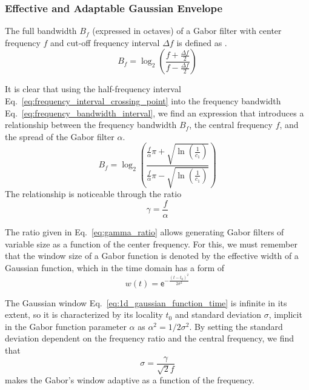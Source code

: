 \subsubsection{Effective and Adaptable Gaussian Envelope}
The full bandwidth $B_f$ (expressed in octaves) of a Gabor filter with center frequency $f$ and cut-off frequency interval $\Delta f$ is defined as \citep{Daugman:JOSA:1985}.
\begin{equation}\label{eq:frequency_bandwidth_interval}
    B_f = \log_2 \left( \frac{f + \frac{\Delta f}{2} }{f - \frac{\Delta f}{2}} \right)
\end{equation}

It is clear that using the half-frequency interval Eq.\ \eqref{eq:frequency_interval_crossing_point} into the frequency bandwidth Eq.\ \eqref{eq:frequency_bandwidth_interval}, we find an expression that introduces a relationship between the frequency bandwidth $B_f$, the central frequency $f$, and the spread of the Gabor filter $\alpha$.
\begin{equation}\label{eq:frequency_bandwidth}
    B_f = \log_2 \left( \frac{ \frac{f}{\alpha} \pi + \sqrt{\ln \left(\frac{1}{c_1}\right)} }{ \frac{f}{\alpha} \pi - \sqrt{\ln \left(\frac{1}{c_1}\right)} } \right)
\end{equation}
The relationship is noticeable through the ratio 
\begin{equation}\label{eq:gamma_ratio}
    \gamma = \frac{f}{\alpha}
\end{equation}

The ratio given in Eq.\ \eqref{eq:gamma_ratio} allows generating Gabor filters of variable size as a function of the center frequency. For this, we must remember that the window size of a Gabor function is denoted by the effective width of a Gaussian function, which in the time domain has a form of
\begin{equation}\label{eq:1d_gaussian_function_time}
    w(t)=\mathsf{e}^{-\frac{(t-t_0)^2}{2\sigma^2}}
\end{equation}

The Gaussian window Eq.\ \eqref{eq:1d_gaussian_function_time} is infinite in its extent, so it is characterized by its locality $t_0$ and standard deviation $\sigma$, implicit in the Gabor function parameter $\alpha$ as $\alpha^2 = 1 / 2 \sigma^2$. By setting the standard deviation dependent on the frequency ratio and the central frequency, we find that
\begin{equation}
	\sigma = \frac{\gamma}{\sqrt{2}f} \label{eq:1D_Gaussian_envelope_width}
\end{equation} 
makes the Gabor's window adaptive as a function of the frequency.

